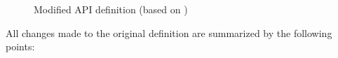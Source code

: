     \begin{figure}[ht]
        \centering
        \caption{Modified API definition (based on \cite{world_wide_web_consortium_credentials_community_group_vc_2021})}
        \label{figure: api definition}
    \end{figure}
    
    All changes made to the original definition are summarized by the following points:
    
